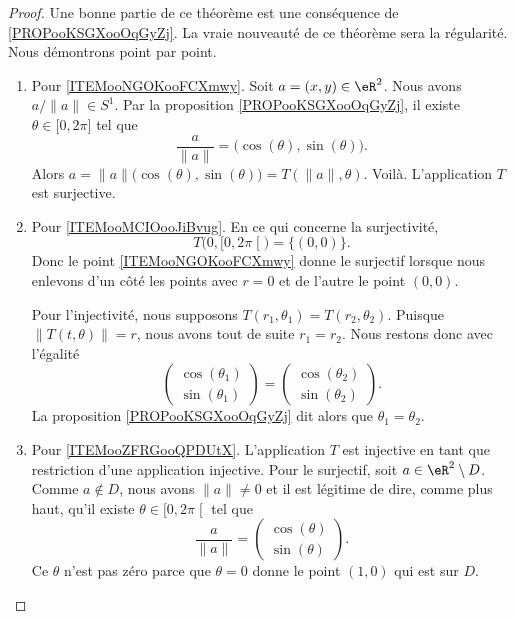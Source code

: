 \begin{proof}
	Une bonne partie de ce théorème est une conséquence de \ref{PROPooKSGXooOqGyZj}. La vraie nouveauté de ce théorème sera la régularité.  Nous démontrons point par point.
	\begin{enumerate}
		\item
		      Pour \ref{ITEMooNGOKooFCXmwy}. Soit \( a=(x,y)\in \eR^2\). Nous avons \( a/\| a \|\in S^1\). Par la proposition \ref{PROPooKSGXooOqGyZj}, il existe \( \theta\in \mathopen[ 0 , 2\pi \mathclose]\) tel que
		      \begin{equation}
			      \frac{ a }{ \| a \| }=\big( \cos(\theta),\sin(\theta) \big).
		      \end{equation}
		      Alors \( a=  \| a \|\big( \cos(\theta),\sin(\theta) \big)= T(\| a \|,\theta)\). Voilà. L'application \( T\) est surjective.
		\item
		      Pour \ref{ITEMooMCIOooJiBvug}. En ce qui concerne la surjectivité,
		      \begin{equation}
			      T\big( 0,\mathopen[ 0 , 2\pi \mathclose[ \big)=\{ (0,0) \}.
		      \end{equation}
		      Donc le point \ref{ITEMooNGOKooFCXmwy} donne le surjectif lorsque nous enlevons d'un côté les points avec \( r=0\) et de l'autre le point \( (0,0)\).

		      Pour l'injectivité, nous supposons \( T(r_1,\theta_1)=T(r_2,\theta_2)\). Puisque \( \| T(t,\theta) \|=r\), nous avons tout de suite \( r_1=r_2\). Nous restons donc avec l'égalité
		      \begin{equation}
			      \begin{pmatrix}
				      \cos(\theta_1) \\
				      \sin(\theta_1)
			      \end{pmatrix}=\begin{pmatrix}
				      \cos(\theta_2) \\
				      \sin(\theta_2)
			      \end{pmatrix}.
		      \end{equation}
		      La proposition \ref{PROPooKSGXooOqGyZj} dit alors que \( \theta_1=\theta_2\).
		\item
		      Pour \ref{ITEMooZFRGooQPDUtX}. L'application \( T\) est injective en tant que restriction d'une application injective. Pour le surjectif, soit \( a\in \eR^2\setminus D\). Comme \( a\notin D\), nous avons \( \| a \|\neq 0\) et il est légitime de dire, comme plus haut, qu'il existe \( \theta\in \mathopen[ 0 , 2\pi \mathclose[\) tel que
		      \begin{equation}
			      \frac{ a }{ \| a \| }=\begin{pmatrix}
				      \cos(\theta) \\
				      \sin(\theta)
			      \end{pmatrix}.
		      \end{equation}
		      Ce \( \theta\) n'est pas zéro parce que \( \theta=0\) donne le point \( (1,0)\) qui est sur \( D\).


\end{enumerate}
\end{proof}
